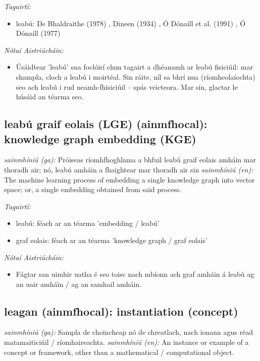 \documentclass{article}
\begin{document}
 \noindent \textit{Tagairtí:}
\begin{itemize}
	\item leabú: De Bhaldraithe (1978) \cite{de-bhaldraithe}, Dineen (1934) \cite{dineen}, Ó Dónaill et al. (1991) \cite{focloir-beag}, Ó Dónaill (1977) \cite{odonaill}
\end{itemize}

 \noindent \textit{Nótaí Aistriúcháin:}
\begin{itemize}
	\item Úsáidtear 'leabú' sna foclóirí chun tagairt a dhéanamh ar leabú fisiciúil: mar shampla, cloch a leabú i moirtéal. Sin ráite, níl sa bhrí nua (ríomheolaíochta) seo ach leabú i rud neamh-fhisiciúil -- spás veicteora. Mar sin, glactar le húsáid an téarma seo.
\end{itemize}


\subsection*{leabú graif eolais (LGE) (ainmfhocal): knowledge graph embedding (KGE)} 
 \noindent \textit{sainmhíniú (ga):} Próiseas ríomhfhoghlama a bhfuil leabú graif eolais amháin mar thoradh air; nó, leabú amháin a fhaightear mar thoradh air sin
\newline\newline
 \noindent \textit{sainmhíniú (en):} The machine learning process of embedding a single knowledge graph into vector space; or, a single embedding obtained from said process.
\newline

 \noindent \textit{Tagairtí:}
\begin{itemize}
	\item leabú: féach ar an téarma 'embedding / leabú'
	\item graf eolais: féach ar an téarma 'knowledge graph / graf eolais'
\end{itemize}

 \noindent \textit{Nótaí Aistriúcháin:}
\begin{itemize}
	\item Fágtar san uimhir uatha é seo toisc nach mbíonn ach graf amháin á leabú ag an uair amháin / ag an samhail amháin.
\end{itemize}


\subsection*{leagan (ainmfhocal): instantiation (concept)} 
 \noindent \textit{sainmhíniú (ga):} Sampla de choincheap nó de chreatlach, nach ionann agus réad matamaiticiúil / ríomhaireachta.
\newline\newline
 \noindent \textit{sainmhíniú (en):} An instance or example of a concept or framework, other than a mathematical / computational object.
\newline
\end{document}
